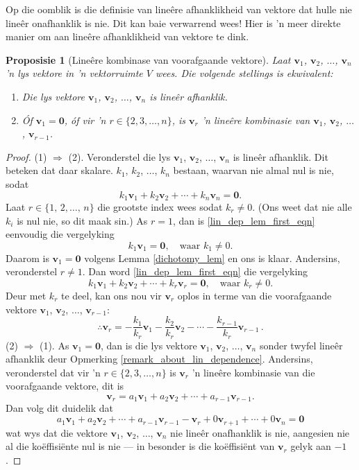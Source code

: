 \documentclass[a4paper,11pt]{book}
\newtheorem{proposition}[theorem]{Proposisie}
\theoremstyle{definition}
\newcommand{\be}{\begin{equation}}
\newcommand{\ee}{\end{equation}}
\newcommand{\ve}[1]{\mathbf{#1}}
\begin{document}
Op die oomblik is die definisie van line{\^e}re afhanklikheid van vektore
dat hulle nie line{\^e}r onafhanklik is nie. Dit kan baie verwarrend wees!
Hier is 'n meer direkte manier om aan line{\^e}re afhanklikheid van vektore
te dink.
\begin{proposition}[Line{\^e}re kombinase van voorafgaande vektore]
	\label{lin_dependence_prop} Laat $\ve{v}_1$,
	$\ve{v}_2$, $\ldots$, $\ve{v}_n$ 'n lys vektore in 'n vektorruimte $V$
	wees. Die volgende stellings is ekwivalent:
	\begin{enumerate}
		\item Die lys vektore $\ve{v}_1$, $\ve{v}_2$, $\ldots$, $\ve{v}_n$
			is line{\^e}r afhanklik.
		\item Óf $\ve{v}_1 = \ve{0}$, óf vir 'n $r \in \{2, 3, \ldots,
			n\}$, is $\ve{v}_r$ 'n line{\^e}re kombinasie van $\ve{v}_1$,
			$\ve{v}_2$, $\ldots$, $\ve{v}_{r-1}$.
	\end{enumerate}
\end{proposition}
\begin{proof} (1) $\Rightarrow$ (2). Veronderstel die lys $\ve{v}_1$,
	$\ve{v}_2$, $\ldots$, $\ve{v}_n$ is line{\^e}r afhanklik. Dit beteken
	dat daar skalare. $k_1$, $k_2$, $\ldots$, $k_n$ bestaan, waarvan nie
	almal nul is nie, sodat
	\be \label{lin_dep_lem_first_eqn}
	k_1 \ve{v}_1 + k_2 \ve{v}_2 + \cdots + k_n \ve{v}_n = \ve{0}.
	\ee
	Laat $r \in \{1, \,2, \ldots, \, n\}$ die grootste index wees sodat
	$k_r \neq 0$. (Ons weet dat nie alle $k_i$ is nul nie, so dit maak
	sin.) As $r=1$, dan is \eqref{lin_dep_lem_first_eqn} eenvoudig die
	vergelyking
	\[
		k_1 \ve{v}_1 = \ve{0}, \quad \mbox{waar } k_1 \neq 0.
	\]
	Daarom is $\ve{v}_1 = \ve{0}$ volgens Lemma \ref{dichotomy_lem} en ons
	is klaar. Andersins, veronderstel $r \neq 1$. Dan word
	\eqref{lin_dep_lem_first_eqn} die vergelyking
	\[
		k_1 \ve{v}_1 + k_2 \ve{v}_2 + \cdots + k_r \ve{v}_r = \ve{0}, \quad
		\mbox{waar } k_r \neq 0.
	\]
	Deur met $k_r$ te deel, kan ons nou vir $\ve{v}_r$ oplos in terme van
	die voorafgaande vektore $\ve{v}_1$, $\ve{v}_2$, $\ldots$,
	$\ve{v}_{r-1}$:
	\[
		\therefore \ve{v}_r = - \frac{k_1}{k_r} \ve{v}_1 - \frac{k_2}{k_r}
		\ve{v}_2 - \cdots - \frac{k_{r-1}}{k_r} \ve{v}_{r-1} \, .
	\]
	(2) $\Rightarrow$ (1). As $\ve{v}_1 = \ve{0}$, dan is die lys vektore
	$\ve{v}_1$, $\ve{v}_2$, $\ldots$, $\ve{v}_n$ sonder twyfel line{\^e}r
	afhanklik deur Opmerking \ref{remark_about_lin_dependence}. Andersins,
	veronderstel dat vir 'n $r \in \{2, 3, \ldots, n\}$ is $\ve{v}_r$ 'n
	line{\^e}re kombinasie van die voorafgaande vektore, dit is
	\[
		\ve{v}_r = a_1 \ve{v}_1 + a_2 \ve{v}_2 + \cdots + a_{r-1}
		\ve{v}_{r-1}.
	\]
	Dan volg dit duidelik dat
	\[
		a_1 \ve{v}_1 + a_2 \ve{v}_2 + \cdots + a_{r-1} \ve{v}_{r-1} -
		\ve{v}_r + 0 \ve{v}_{r+1} + \cdots + 0 \ve{v}_n = \ve{0}
	\]
	wat wys dat die vektore $\ve{v}_1$, $\ve{v}_2$, $\ldots$, $\ve{v}_n$
	nie line{\^e}r onafhanklik is nie, aangesien nie al die
	ko{\"e}ffisi{\"e}nte nul is
	nie --- in besonder is die ko{\"e}ffisi{\"e}nt van $\ve{v}_r$ gelyk aan
	$-1$.
\end{proof}
\end{document}
